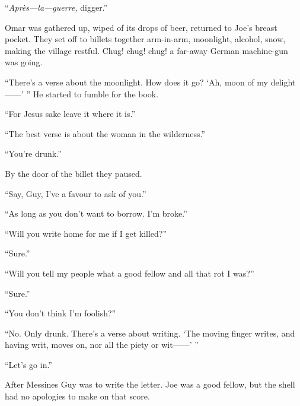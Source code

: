 ``\textit{Apr\`{e}s---la---guerre,} digger.''

Omar was gathered up, wiped of its drops of beer, returned to Joe's breast pocket. They set off to billets together arm-in-arm, moonlight, alcohol, snow, making the village restful. Chug! chug! chug! a far-away German machine-gun was going.

``There's a verse about the moonlight. How does it go? `Ah, moon of my delight------' '' He started to fumble for the book.

``For Jesus sake leave it where it is.''

``The best verse is about the woman in the wilderness.''

``You're drunk.''

By the door of the billet they paused.

``Say, Guy, I've a favour to ask of you.''

``As long as you don't want to borrow. I'm broke.''

``Will you write home for me if I get killed?''

``Sure.''

``Will you tell my people what a good fellow and all that rot I was?''

``Sure.''

``You don't think I'm foolish?''

``No. Only drunk. There's a verse about writing. `The moving finger writes, and having writ, moves on, nor all the piety or wit------' ''

``Let's go in.''

After Messines Guy was to write the letter. Joe was a good fellow, but the shell had no apologies to make on that score.